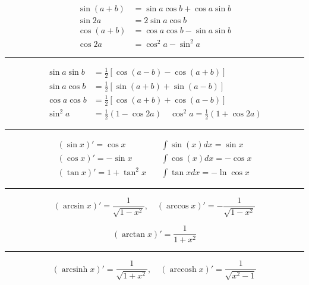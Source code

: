 \documentclass{article}
\DeclareMathOperator{\arcsinh}{arcsinh}
\DeclareMathOperator{\arccosh}{arccosh}
\begin{document}
\begin{multicols}{2}

\begin{align*}
  \sin(a+b) &=  \sin a \cos b + \cos a \sin b \\
  \sin 2a &= 2 \sin a \cos b \\
  \cos(a+b) &= \cos a \cos b - \sin a \sin b \\
  \cos 2a &= \cos^2 a - \sin^2 a
\end{align*}

\hrule

\vspace*{0mm}

\begin{align*}
  \sin a \sin b &= \frac{1}{2} \left[ \cos(a-b)  - \cos(a + b) \right] \\
  \sin a \cos b &= \frac{1}{2} \left[ \sin(a+b)  + \sin(a - b) \right] \\
  \cos a \cos b &= \frac{1}{2} \left[ \cos(a+b)  + \cos(a - b) \right] \\
  \sin^2 a &= \frac{1}{2} \left(1 - \cos 2a \right) \quad \cos^2 a = \frac{1}{2} \left( 1 + \cos 2a \right)
\end{align*}

\hrule

\begin{align*}
  (\sin x)' = \cos x & \quad \int \sin(x) dx = \sin x \\
  (\cos x)' = -\sin x & \quad \int \cos(x) dx = - \cos x \\
  (\tan x)' = 1 + \tan^2 x & \quad \int \tan x dx  = - \ln \cos x
\end{align*}

\hrule

\vspace*{2mm}

\begin{equation*}
  (\arcsin x)' = \frac{1}{\sqrt{1 - x^2}}, \quad (\arccos x)' = -\frac{1}{\sqrt{1 - x^2}}
\end{equation*}

\vspace*{0mm}

\begin{equation*}
  (\arctan x)' = \frac{1}{1+x^2}
\end{equation*}

\hrule

\vspace*{2mm}

\begin{equation*}
  (\arcsinh x)' = \frac{1}{\sqrt{1 + x^2}}, \quad (\arccosh x)' = \frac{1}{\sqrt{x^2 - 1}}
\end{equation*}


\end{multicols}
\end{document}
